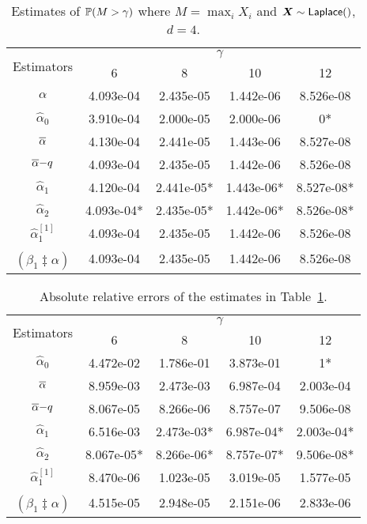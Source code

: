 \begin{table}[H]
\centering
\begin{tabular}{ccccc}
\toprule
\multirow{2}{*}{Estimators} & \multicolumn{4}{c}{$\gamma$} \\
                            & 6    & 8    & 10    & 12    \\
\midrule
$\alpha$ & 4.093e-04 & 2.435e-05 & 1.442e-06 & 8.526e-08 \\
\rowcolor{Gray} $\hat{\alpha}_0$ & 3.910e-04 & 2.000e-05 & 2.000e-06 & 0* \\
$\overline{\alpha}$ & 4.130e-04 & 2.441e-05 & 1.443e-06 & 8.527e-08 \\
\rowcolor{Gray} $\overline{\alpha}{-}q$ & 4.093e-04 & 2.435e-05 & 1.442e-06 & 8.526e-08 \\
$\hat{\alpha}_1$ & 4.120e-04 & 2.441e-05* & 1.443e-06* & 8.527e-08* \\
\rowcolor{Gray} $\hat{\alpha}_2$ & 4.093e-04* & 2.435e-05* & 1.442e-06* & 8.526e-08* \\
$\hat{\alpha}_1^{[1]}$ & 4.093e-04 & 2.435e-05 & 1.442e-06 & 8.526e-08 \\
\rowcolor{Gray} $\widehat{(\beta_1 \ddagger \alpha)}$ & 4.093e-04 & 2.435e-05 & 1.442e-06 & 8.526e-08 \\
\bottomrule
\end{tabular}
\caption{Estimates of $\operatorname{{\mathbb P}}(M>\gamma)$ where $M=\max_i X_i$ and $\bm{X} \sim \mathsf{Laplace}()$, $d=4$.}
\label{table:laplace_ests}
\end{table}


\begin{table}[H]
\centering
\begin{tabular}{ccccc}
\toprule
\multirow{2}{*}{Estimators} & \multicolumn{4}{c}{$\gamma$} \\
                            & 6    & 8    & 10    & 12    \\
\midrule
$\hat{\alpha}_0$ & 4.472e-02 & 1.786e-01 & 3.873e-01 & 1* \\
\rowcolor{Gray} $\overline{\alpha}$ & 8.959e-03 & 2.473e-03 & 6.987e-04 & 2.003e-04 \\
$\overline{\alpha}{-}q$ & 8.067e-05 & 8.266e-06 & 8.757e-07 & 9.506e-08 \\
\rowcolor{Gray} $\hat{\alpha}_1$ & 6.516e-03 & 2.473e-03* & 6.987e-04* & 2.003e-04* \\
$\hat{\alpha}_2$ & 8.067e-05* & 8.266e-06* & 8.757e-07* & 9.506e-08* \\
\rowcolor{Gray} $\hat{\alpha}_1^{[1]}$ & 8.470e-06 & 1.023e-05 & 3.019e-05 & 1.577e-05 \\
$\widehat{(\beta_1 \ddagger \alpha)}$ & 4.515e-05 & 2.948e-05 & 2.151e-06 & 2.833e-06 \\
\bottomrule
\end{tabular}
\caption{Absolute relative errors of the estimates in Table~\ref{table:laplace_ests}.}
\end{table}


